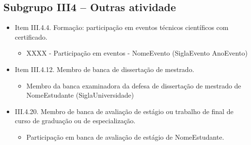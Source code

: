 \subsection{Subgrupo III4 -- Outras atividade}

\begin{itemize}
    \item Item III.4.4. Formação: participação em eventos técnicos científicos com certificado.
    \begin{itemize}
        \item XXXX - Participação em eventos - NomeEvento (SiglaEvento AnoEvento)
    \end{itemize}

    \item Item III.4.12. Membro de banca de dissertação de mestrado.
    \begin{itemize}
        \item Membro da banca examinadora da defesa de dissertação de mestrado de NomeEstudante (SiglaUniversidade)
    \end{itemize}

    \item III.4.20. Membro de banca de avaliação de estágio ou trabalho de final de curso de graduação ou de especialização.
    \begin{itemize}
        \item Participação em banca de avaliação de estágio de NomeEstudante.
    \end{itemize}
\end{itemize}
